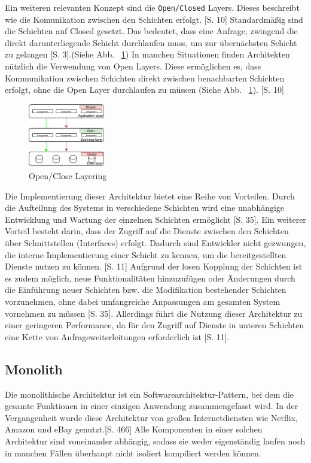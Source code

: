 \documentclass[acmtog]{acmart}
\begin{document}
Ein weiteren relevanten Konzept sind die \texttt{Open/Closed} Layers. Dieses beschreibt wie die 
Komunikation zwischen den Schichten erfolgt. \cite{layered4}[S. 10]
Standardmäßig sind die Schichten auf Closed gesetzt. Das bedeutet, dass eine Anfrage, 
zwingend die direkt darunterliegende Schicht durchlaufen muss, um zur übernächsten Schicht zu gelangen \cite{layered}[S. 3].(Siehe Abb. ~\ref{fig:layered-request-flow})
In manchen Situationen finden Architekten nützlich die Verwendung von Open Layers. Diese ermöglichen 
es, dass Kommunikation zwischen Schichten direkt zwischen benachbarten Schichten erfolgt, ohne die 
Open Layer durchlaufen zu müssen  (Siehe Abb. ~\ref{fig:layered-request-flow}). \cite{layered4}[S. 10]

\begin{figure}[h!]
    \centering
    \includegraphics[width=0.3\textwidth]{images/layer2.pdf}
    \caption{Open/Close Layering}
    \label{fig:layered-request-flow}
\end{figure}


Die Implementierung dieser Architektur bietet eine Reihe von Vorteilen. Durch 
die Aufteilung des Systems in verschiedene Schichten wird eine unabhängige 
Entwicklung und Wartung der einzelnen Schichten ermöglicht \cite{layered2}[S. 35]. 
Ein weiterer Vorteil besteht darin, dass der Zugriff auf die Dienste zwischen den 
Schichten über Schnittstellen (Interfaces) erfolgt. Dadurch sind Entwickler nicht 
gezwungen, die interne Implementierung einer Schicht zu kennen, um die bereitgestellten 
Dienste nutzen zu können. \cite{layered4}[S. 11]
Aufgrund der losen Kopplung der Schichten ist es zudem möglich, neue Funktionalitäten
hinzuzufügen oder Änderungen durch die Einführung neuer Schichten bzw. die Modifikation 
bestehender Schichten vorzunehmen, ohne dabei umfangreiche Anpassungen am gesamten 
System vornehmen zu müssen \cite{layered2}[S. 35].
Allerdings führt die Nutzung dieser Architektur zu einer geringeren Performance, da für 
den Zugriff auf Dienste in unteren Schichten eine Kette von Anfrageweiterleitungen erforderlich ist \cite{layered4}[S. 11].

\subsection{Monolith}
Die monolithische Architektur ist ein Softwarearchitektur-Pattern, bei dem die gesamte Funktionen in 
einer einzigen Anwendung zusammengefasst wird. 
In der Vergangenheit wurde diese Architektur von großen Internetdiensten wie Netflix, 
Amazon und eBay genutzt.\cite{mono}[S. 466]
Alle Komponenten in einer solchen Architektur sind voneinander abhängig, sodass sie 
weder eigenständig laufen noch in manchen Fällen überhaupt nicht isoliert kompiliert werden können. \cite{mono3}
\end{document}
